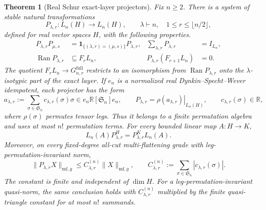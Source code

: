 \documentclass[10pt,reqno]{amsart}
\theoremstyle{plain}
\newtheorem{theorem}{Theorem}[section]
\theoremstyle{definition}
\theoremstyle{remark}
\begin{document}
\begin{theorem}[Real Schur exact-layer projectors]
\label{cc:thm-schur-exact-projectors}
Fix \(n\geq2\).  There is a system of stable natural transformations
\[
 P_{\lambda,r}:L_n(H)\longrightarrow L_n(H),
 \qquad
 \lambda\vdash n,\quad
 1\leq r\leq\lfloor n/2\rfloor,
\]
defined for real vector spaces \(H\), with the following properties.
\begin{align}
 P_{\lambda,r}P_{\mu,s}
 &=\mathbf1_{\{(\lambda,r)=(\mu,s)\}}P_{\lambda,r},
 &
 \sum_{\lambda,r}P_{\lambda,r}
 &=I_{L_n},
 \label{cc:eq-exact-projector-orthogonality}\\
 \operatorname{Ran}P_{\lambda,r}
 &\subseteq F_rL_n,
 &
 P_{\lambda,r}(F_{r+1}L_n)&=0.
 \label{cc:eq-exact-projector-filtration}
\end{align}
The quotient \(F_rL_n\to G^{\mathrm{full}}_{n,r}\) restricts to an
isomorphism from \(\operatorname{Ran}P_{\lambda,r}\) onto the
\(\lambda\)-isotypic part of the exact layer.  If \(e_n\) is a normalized
real Dynkin--Specht--Wever idempotent, each projector has the form
\begin{equation}
 a_{\lambda,r}
 :=\sum_{\sigma\in\mathfrak S_n}c_{\lambda,r}(\sigma)\sigma
 \in e_n\mathbb R[\mathfrak S_n]e_n,
 \qquad
 P_{\lambda,r}
 =\left.\rho(a_{\lambda,r})\right|_{L_n(H)},
 \qquad c_{\lambda,r}(\sigma)\in\mathbb R,
 \label{cc:eq-real-permutation-projector}
\end{equation}
where \(\rho(\sigma)\) permutes tensor legs.  Thus it belongs to a finite
permutation algebra and uses at most \(n!\) permutation terms.
For every bounded linear map \(A:H\to K\),
\begin{equation}
 L_n(A)P_{\lambda,r}^{H}
 =P_{\lambda,r}^{K}L_n(A).
 \label{cc:eq-projector-bounded-naturality}
\end{equation}
Moreover, on every fixed-degree all-cut multi-flattening grade with
leg-permutation-invariant norm,
\begin{equation}
 \|P_{\lambda,r}X\|_{\mathrm{mf},g}
 \leq C_{\lambda,r}^{(n)}\|X\|_{\mathrm{mf},g},
 \qquad
 C_{\lambda,r}^{(n)}
 :=\sum_{\sigma\in\mathfrak S_n}|c_{\lambda,r}(\sigma)|.
 \label{cc:eq-projector-multiflat-bound}
\end{equation}
The constant is finite and independent of \(\dim H\).
For a leg-permutation-invariant quasi-norm, the same conclusion holds
with \(C_{\lambda,r}^{(n)}\) multiplied by the finite quasi-triangle
constant for at most \(n!\) summands.


\end{theorem}
\end{document}
